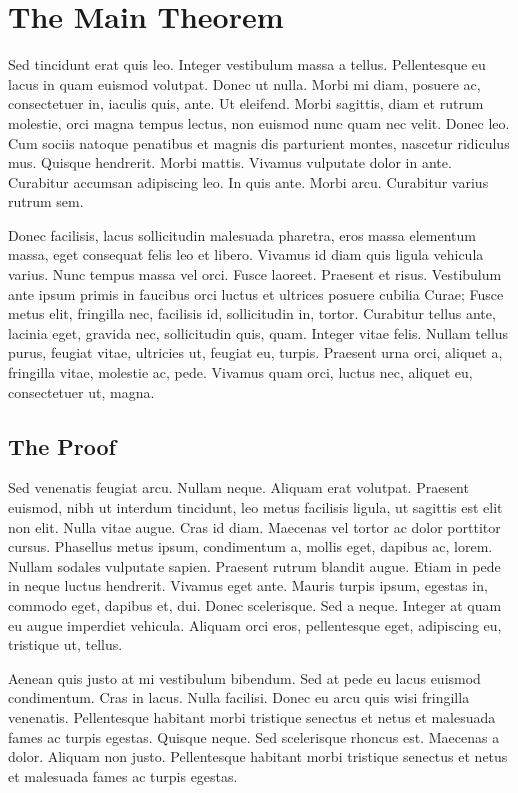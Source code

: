 \documentclass[showtrims]{kthesis}
\begin{document}
\section{The Main Theorem}

Sed tincidunt erat quis leo. Integer vestibulum massa a tellus.
Pellentesque eu lacus in quam euismod volutpat. Donec ut nulla. Morbi
mi diam, posuere ac, consectetuer in, iaculis quis, ante. Ut eleifend.
Morbi sagittis, diam et rutrum molestie, orci magna tempus lectus, non
euismod nunc quam nec velit. Donec leo. Cum sociis natoque penatibus
et magnis dis parturient montes, nascetur ridiculus mus. Quisque
hendrerit. Morbi mattis. Vivamus vulputate dolor in ante. Curabitur
accumsan adipiscing leo. In quis ante. Morbi arcu. Curabitur varius
rutrum sem.

Donec facilisis, lacus sollicitudin malesuada pharetra, eros massa
elementum massa, eget consequat felis leo et libero. Vivamus id diam
quis ligula vehicula varius. Nunc tempus massa vel orci. Fusce
laoreet. Praesent et risus. Vestibulum ante ipsum primis in faucibus
orci luctus et ultrices posuere cubilia Curae; Fusce metus elit,
fringilla nec, facilisis id, sollicitudin in, tortor. Curabitur tellus
ante, lacinia eget, gravida nec, sollicitudin quis, quam. Integer
vitae felis. Nullam tellus purus, feugiat vitae, ultricies ut, feugiat
eu, turpis. Praesent urna orci, aliquet a, fringilla vitae, molestie
ac, pede. Vivamus quam orci, luctus nec, aliquet eu, consectetuer ut,
magna.

\subsection{The Proof}

Sed venenatis feugiat arcu. Nullam neque. Aliquam erat volutpat.
Praesent euismod, nibh ut interdum tincidunt, leo metus facilisis
ligula, ut sagittis est elit non elit. Nulla vitae augue. Cras id
diam. Maecenas vel tortor ac dolor porttitor cursus. Phasellus metus
ipsum, condimentum a, mollis eget, dapibus ac, lorem. Nullam sodales
vulputate sapien. Praesent rutrum blandit augue. Etiam in pede in
neque luctus hendrerit. Vivamus eget ante. Mauris turpis ipsum,
egestas in, commodo eget, dapibus et, dui. Donec scelerisque. Sed a
neque. Integer at quam eu augue imperdiet vehicula. Aliquam orci eros,
pellentesque eget, adipiscing eu, tristique ut, tellus.

Aenean quis justo at mi vestibulum bibendum. Sed at pede eu lacus
euismod condimentum. Cras in lacus. Nulla facilisi. Donec eu arcu quis
wisi fringilla venenatis. Pellentesque habitant morbi tristique
senectus et netus et malesuada fames ac turpis egestas. Quisque neque.
Sed scelerisque rhoncus est. Maecenas a dolor. Aliquam non justo.
Pellentesque habitant morbi tristique senectus et netus et malesuada
fames ac turpis egestas.
\end{document}

